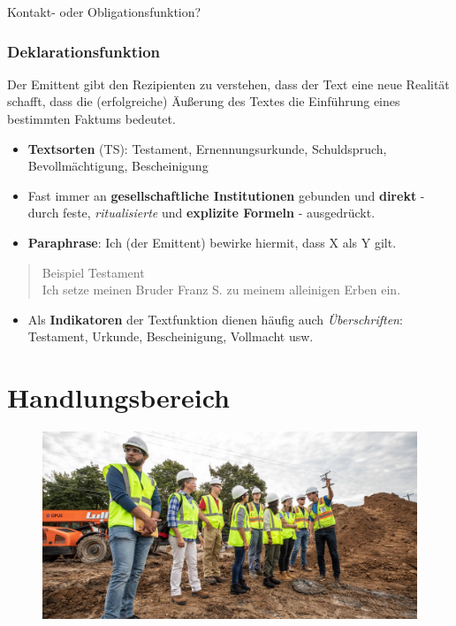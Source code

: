 \documentclass[
  letterpaper,
]{scrbook}
\providecommand{\tightlist}{%
  \setlength{\itemsep}{0pt}\setlength{\parskip}{0pt}}\usepackage{longtable,booktabs,array}
\begin{document}
Kontakt- oder Obligationsfunktion?

\hypertarget{deklarationsfunktion}{%
\subsection{Deklarationsfunktion}\label{deklarationsfunktion}}

Der Emittent gibt den Rezipienten zu verstehen, dass der Text eine neue
Realität schafft, dass die (erfolgreiche) Äußerung des Textes die
Einführung eines bestimmten Faktums bedeutet.

\begin{itemize}
\item
  \textbf{Textsorten} (TS): Testament, Ernennungsurkunde, Schuldspruch,
  Bevollmächtigung, Bescheinigung
\item
  Fast immer an \textbf{gesellschaftliche Institutionen} gebunden und
  \textbf{direkt} - durch feste, \emph{ritualisierte} und
  \textbf{explizite Formeln} - ausgedrückt.
\item
  \textbf{Paraphrase}: Ich (der Emittent) bewirke hiermit, dass X als Y
  gilt.
\end{itemize}

\begin{quote}
Beispiel Testament\\
Ich setze meinen Bruder Franz S. zu meinem alleinigen Erben ein.
\end{quote}

\begin{itemize}
\tightlist
\item
  Als \textbf{Indikatoren} der Textfunktion dienen häufig auch
  \emph{Überschriften}: Testament, Urkunde, Bescheinigung, Vollmacht
  usw.
\end{itemize}

\hypertarget{handlungsbereich}{%
\chapter{Handlungsbereich}\label{handlungsbereich}}

\begin{figure}

{\centering 

\href{https://medium.com/@wchaffecs/civil-engineering-5102246e8353/}{\includegraphics[width=1\textwidth,height=\textheight]{./pictures/civileng.jpg}}

}

\end{figure}
\end{document}
